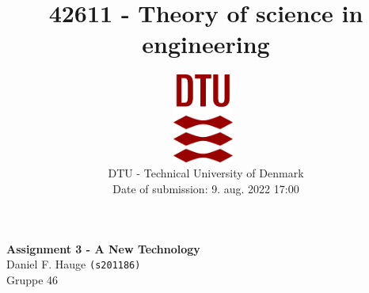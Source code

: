 \documentclass[a4paper]{article}
\begin{document}
\title{42611 - Theory of science in engineering}
\author{
\includegraphics[width=0.15\textwidth]{images/dtu.eps}~\\[1cm]
    DTU - Technical University of Denmark
    \\[0.5cm]
    Date of submission: 9. aug. 2022 17:00
    \\
}
\date{} %
\color{black}
\maketitle
\begin{center}
{ \huge \bfseries Assignment 3 - A New Technology}\\

\vspace{.25cm}
Daniel F. Hauge \texttt{(s201186)}\\
Gruppe 46


\vspace{.25cm}
\end{center}

\medskip
\newpage


\end{document}
